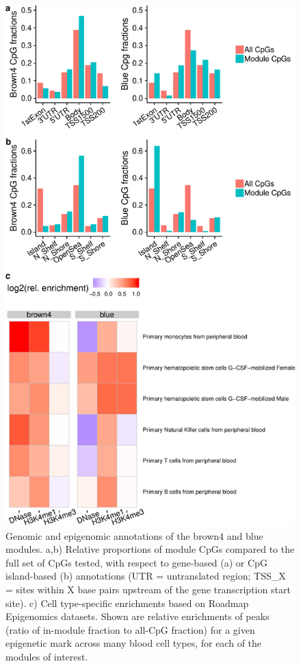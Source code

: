 \documentclass[]{article}
\theoremstyle{definition}
\theoremstyle{definition}
\theoremstyle{definition}
\theoremstyle{remark}
\begin{document}
\begin{figure}[htbp]
\centering
\includegraphics{../doc/module_ewas/figures/brown-and-blue-plots-1.pdf}
\caption{\label{fig:brown-and-blue-plots}Genomic and epigenomic annotations
of the brown4 and blue modules. a,b) Relative proportions of module CpGs
compared to the full set of CpGs tested, with respect to gene-based (a)
or CpG island-based (b) annotations (UTR = untranslated region; TSS\_X =
sites within X base pairs upstream of the gene transcription start
site). c) Cell type-specific enrichments based on Roadmap Epigenomics
datasets. Shown are relative enrichments of peaks (ratio of in-module
fraction to all-CpG fraction) for a given epigenetic mark across many
blood cell types, for each of the modules of interest.}
\end{figure}
\end{document}
